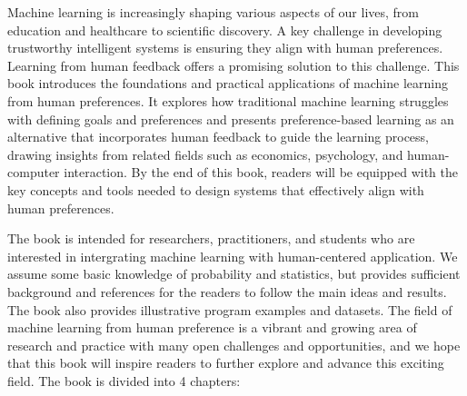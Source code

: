 \documentclass[
  letterpaper,
  numbers=noenddot,
  DIV=11]{scrreprt}
\theoremstyle{definition}
\theoremstyle{plain}
\theoremstyle{plain}
\theoremstyle{remark}
\begin{document}
Machine learning is increasingly shaping various aspects of our lives,
from education and healthcare to scientific discovery. A key challenge
in developing trustworthy intelligent systems is ensuring they align
with human preferences. Learning from human feedback offers a promising
solution to this challenge. This book introduces the foundations and
practical applications of machine learning from human preferences. It
explores how traditional machine learning struggles with defining goals
and preferences and presents preference-based learning as an alternative
that incorporates human feedback to guide the learning process, drawing
insights from related fields such as economics, psychology, and
human-computer interaction. By the end of this book, readers will be
equipped with the key concepts and tools needed to design systems that
effectively align with human preferences.

The book is intended for researchers, practitioners, and students who
are interested in intergrating machine learning with human-centered
application. We assume some basic knowledge of probability and
statistics, but provides sufficient background and references for the
readers to follow the main ideas and results. The book also provides
illustrative program examples and datasets. The field of machine
learning from human preference is a vibrant and growing area of research
and practice with many open challenges and opportunities, and we hope
that this book will inspire readers to further explore and advance this
exciting field. The book is divided into 4 chapters:
\end{document}
